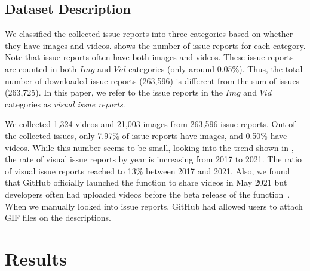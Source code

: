 \subsection{Dataset Description}

We classified the collected issue reports into three categories based on whether they have images and videos. 
 shows the number of issue reports for each category. 
Note that issue reports often have both images and videos. 
These issue reports are counted in both $Img$ and $Vid$ categories (only around 0.05\%). 
Thus, the total number of downloaded issue reports (263,596) is different from the sum of issues (263,725).
In this paper, we refer to the issue reports in the $Img$ and $Vid$ categories
as \textit{visual issue reports}. 

We collected 1,324 videos and 21,003 images from 263,596 issue reports. 
Out of the collected issues, only 7.97\% of issue reports have images, and 0.50\% have videos. 
While this number seems to be small, looking into the trend shown in , the rate of visual issue reports by year is increasing from 2017 to 2021. 
The ratio of visual issue reports reached to 13\% between 2017 and 2021. 
Also, we found that GitHub officially launched the function to share videos in May 2021 but developers often had uploaded videos before the beta release of the function~\citep{github-video-blog}. 
When we manually looked into issue reports, GitHub had allowed users to attach GIF files on the descriptions.

\section{Results}
\label{sec:results}

% 

